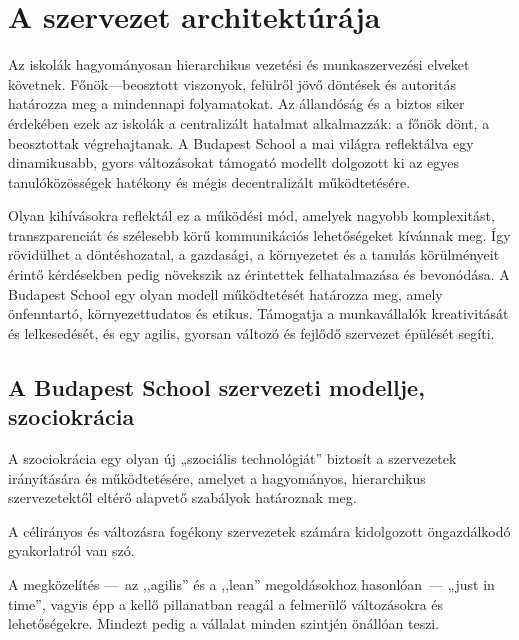 \vspace*{.5ex}
\hypertarget{szervezet-architekturaja}{%
\section{A szervezet architektúrája}\label{szervezet-architekturaja}}

Az iskolák hagyományosan hierarchikus vezetési és munkaszervezési
elveket követnek. Főnök---beosztott viszonyok, felülről jövő döntések és
autoritás határozza meg a mindennapi folyamatokat. Az állandóság és a
biztos siker érdekében ezek az iskolák a centralizált hatalmat
alkalmazzák: a főnök dönt, a beosztottak végrehajtanak. A Budapest
School a mai világra reflektálva egy dinamikusabb, gyors változásokat
támogató modellt dolgozott ki az egyes tanulóközösségek hatékony és
mégis decentralizált működtetésére.

Olyan kihívásokra reflektál ez a működési mód, amelyek nagyobb\break
komplexitást, transzparenciát és szélesebb körű kommunikációs
lehetőségeket kívánnak meg. Így rövidülhet a döntéshozatal, a gazdasági,
a környezetet és a tanulás körülményeit érintő kérdésekben pedig
növekszik az érintettek felhatalmazása és bevonódása. A Budapest School
egy olyan modell működtetését határozza meg, amely önfenntartó,
környezettudatos és etikus. Támogatja a munkavállalók kreativitását és
lelkesedését, és egy agilis, gyorsan változó és fejlődő szervezet
épülését segíti.

\vspace*{.5ex}
\hypertarget{a-budapest-school-szervezeti-modellje-szociokracia}{%
\subsection{A Budapest School szervezeti modellje,
szociokrácia}\label{a-budapest-school-szervezeti-modellje-szociokracia}}

A szociokrácia egy olyan új „szociális technológiát'' biztosít a
szervezetek irányítására és működtetésére, amelyet a hagyományos,
hierarchikus szervezetektől eltérő alapvető szabályok határoznak meg.


A célirányos és változásra fogékony
szervezetek számára kidolgozott öngazdálkodó gyakorlatról van szó.

A megközelítés ---~az ,,agilis'' és a ,,lean'' megoldásokhoz hasonlóan~--- „just in
time'', vagyis épp a kellő pillanatban reagál a felmerülő változásokra és
lehetőségekre. Mindezt pedig a vállalat minden szintjén önállóan teszi.


